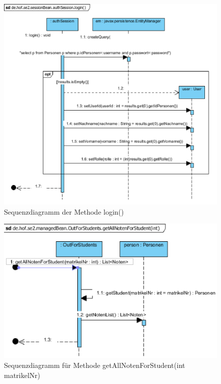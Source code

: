 \documentclass[12pt,a4paper,parskip]{scrreprt}
\begin{document}
\begin{figure}
\centering
\includegraphics[width=0.7\linewidth]{../VP/login}
\caption[Sequenzdiagramm login()]{Sequenzdiagramm der Methode login()}
\label{fig:login}
\end{figure}

\begin{figure}
\centering
\includegraphics[width=1\linewidth]{../VP/NotenStudent}
\caption[Sequenzdiagramm getAllNotenForStudent]{Sequenzdiagramm für Methode getAllNotenForStudent(int matrikelNr)}
\label{fig:NotenStudent}
\end{figure}


\listoffigures
\end{document}
